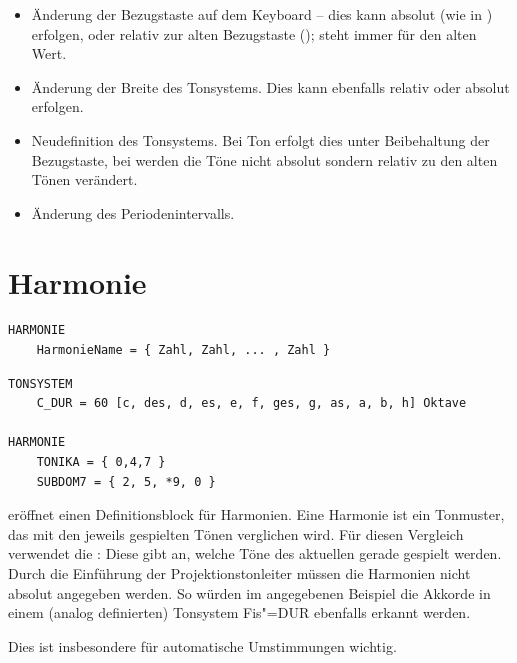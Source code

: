 \begin{itemize}
\item Änderung der Bezugstaste auf dem Keyboard -- dies kann absolut
  (wie in ) erfolgen, oder relativ zur alten
  Bezugstaste (); \keyword{\@} steht immer für den alten Wert.
\item Änderung der Breite des Tonsystems. Dies kann ebenfalls relativ
  oder absolut erfolgen.
\item Neudefinition des Tonsystems. Bei Ton erfolgt dies unter
  Beibehaltung der Bezugstaste, bei  werden die Töne nicht absolut
  sondern relativ zu den alten Tönen verändert.
\item Änderung des Periodenintervalls.
\end{itemize}


\section{Harmonie}
\label{sec:SX_PATTERN}



\begin{verbatim}
HARMONIE
    HarmonieName = { Zahl, Zahl, ... , Zahl }
\end{verbatim}





\begin{verbatim}
TONSYSTEM
    C_DUR = 60 [c, des, d, es, e, f, ges, g, as, a, b, h] Oktave

HARMONIE 
    TONIKA = { 0,4,7 } 
    SUBDOM7 = { 2, 5, *9, 0 }
\end{verbatim}





 eröffnet einen Definitionsblock für Harmonien. Eine
Harmonie ist ein Tonmuster, das mit den jeweils gespielten Tönen
verglichen wird. Für diesen Vergleich verwendet \mutabor{} die
: Diese gibt an,
welche Töne des aktuellen 
gerade gespielt werden. Durch die Einführung der Projektionstonleiter
müssen die Harmonien nicht absolut angegeben werden. So würden im
angegebenen Beispiel die Akkorde in einem (analog definierten)
Tonsystem Fis"=DUR ebenfalls erkannt werden.


Dies ist insbesondere für automatische Umstimmungen wichtig. 



